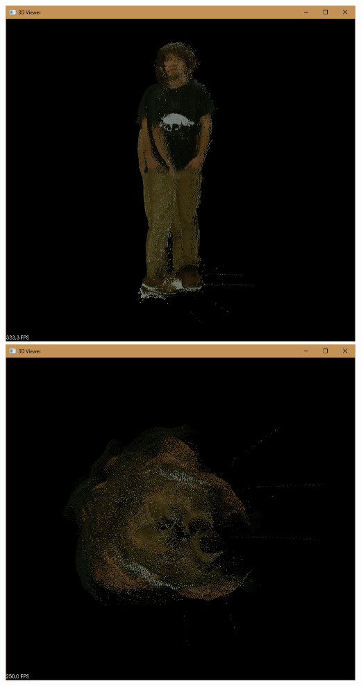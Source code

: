 \documentclass[11pt]{article} %
\begin{document}
\begin{itemize}
	\begin{center}
		\includegraphics[scale = 0.25]{ScanR1.png} 
		\includegraphics[scale = 0.25]{ScanR2.png}

\end{center}
\end{itemize}
\end{document}
